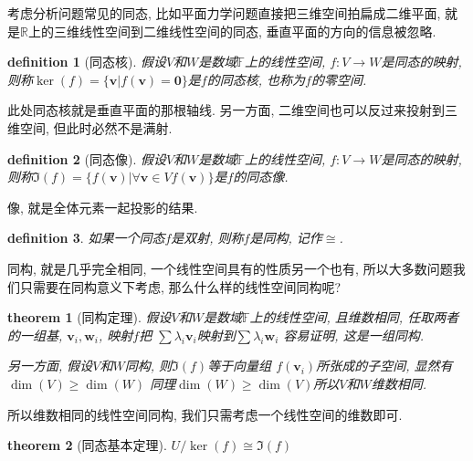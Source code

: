 \documentclass[12pt]{ctexbook}
\newtheorem{definition}{definition}
\numberwithin{definition}{section}
\newtheorem{theorem}{theorem}
\numberwithin{theorem}{section}
\numberwithin{exercise}{section}
\numberwithin{example}{section}
\numberwithin{lemma}{section}
\begin{document}
    考虑分析问题常见的同态, 比如平面力学问题直接把三维空间拍扁成二维平面, 
    就是\(\mathbb{R}\)上的三维线性空间到二维线性空间的同态, 垂直平面的方向的信息被忽略.

    \begin{definition}
        [同态核] 假设\(V\)和\(W\)是数域\(\mathbb{F}\)上的线性空间, \(f: V \rightarrow W\)是同态的映射,
        则称\(\ker(f) = \{\boldsymbol{v} | f(\boldsymbol{v}) = \boldsymbol{0}\}\)是\(f\)的同态核, 也称为\(f\)的零空间.
    \end{definition}

    此处同态核就是垂直平面的那根轴线. 另一方面, 二维空间也可以反过来投射到三维空间, 但此时必然不是满射.

    \begin{definition}
        [同态像] 假设\(V\)和\(W\)是数域\(\mathbb{F}\)上的线性空间, \(f: V \rightarrow W\)是同态的映射,
        则称\(\Im (f) = \{f(\boldsymbol{v}) | \forall \boldsymbol{v} \in V f(\boldsymbol{v})\}\)是\(f\)的同态像.
    \end{definition}

    像, 就是全体元素一起投影的结果.

    \begin{definition}
        如果一个同态\(f\)是双射, 则称\(f\)是同构, 记作\(\cong\).
    \end{definition}

    同构, 就是几乎完全相同, 一个线性空间具有的性质另一个也有, 所以大多数问题我们只需要在同构意义下考虑,
    那么什么样的线性空间同构呢?

    \begin{theorem}
        [同构定理] 假设\(V\)和\(W\)是数域\(\mathbb{F}\)上的线性空间, 且维数相同, 
        任取两者的一组基, \(\boldsymbol{v}_i, \boldsymbol{w}_i\), 映射\(f\)把
        \(\sum \lambda_i \boldsymbol{v}_i\)映射到\(\sum \lambda_i \boldsymbol{w}_i\)
        容易证明, 这是一组同构.
        
        另一方面, 假设\(V\)和\(W\)同构, 则\(\Im (f)\)等于向量组
        \(f(\boldsymbol{v}_i)\)所张成的子空间, 显然有\(\dim (V) \geq \dim (W)\)
        同理\(\dim (W) \geq \dim (V)\)所以\(V\)和\(W\)维数相同.
    \end{theorem}

    所以维数相同的线性空间同构, 我们只需考虑一个线性空间的维数即可.

    \begin{theorem}
        [同态基本定理] \(U/\ker (f) \cong \Im (f)\)
    \end{theorem}
\end{document}
